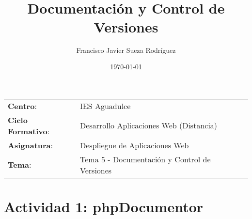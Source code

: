 


\title{
\vspace{10ex}
\normalfont \normalsize
\huge \textbf{Documentación y Control de Versiones}
}
\author{Francisco Javier Sueza Rodríguez}
\date{\normalsize\today}




\maketitle

\thispagestyle{empty}

\vspace{65ex}

\begin{center}
    \begin{tabular}{l l}
        \textbf{Centro}: & IES Aguadulce \\
        \textbf{Ciclo Formativo}: & Desarrollo Aplicaciones Web (Distancia)\\
        \textbf{Asignatura}: & Despliegue de Aplicaciones Web\\
        \textbf{Tema}: & Tema 5 - Documentación y Control de Versiones\\
    \end{tabular}
\end{center}

\newpage

\tableofcontents

\newpage

\listoffigures

\newpage

\section{Actividad 1: phpDocumentor}


%
%


